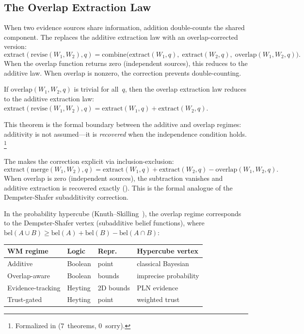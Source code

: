 \documentclass[11pt,openany]{report}
\begin{document}
\subsection{The Overlap Extraction Law}

When two evidence sources share information, addition
double-counts the shared component.  The
 replaces the additive extraction law
with an overlap-corrected version:
\[
  \mathrm{extract}(\mathrm{revise}(W_1, W_2), q)
  = \mathrm{combine}\bigl(
      \mathrm{extract}(W_1, q),\;
      \mathrm{extract}(W_2, q),\;
      \mathrm{overlap}(W_1, W_2, q)
    \bigr).
\]
When the overlap function returns zero (independent sources),
this reduces to the additive law.  When overlap is nonzero, the
correction prevents double-counting.

\begin{theorem}
\label{thm:additive-of-independent}
If $\mathrm{overlap}(W_1, W_2, q)$ is trivial for all~$q$, then
the overlap extraction law reduces to the additive extraction
law: $\mathrm{extract}(\mathrm{revise}(W_1, W_2), q) =
\mathrm{extract}(W_1, q) + \mathrm{extract}(W_2, q)$.
\end{theorem}

\noindent
This theorem is the formal boundary between the additive and
overlap regimes: additivity is not assumed---it is
\emph{recovered} when the independence condition holds.%
\footnote{Formalized in
(7~theorems, 0~sorry).}

The  makes the correction explicit
via inclusion-exclusion:
\[
  \mathrm{extract}(\mathrm{merge}(W_1, W_2), q)
  = \mathrm{extract}(W_1, q) + \mathrm{extract}(W_2, q)
  - \mathrm{overlap}(W_1, W_2, q).
\]
When overlap is zero (independent sources), the subtraction
vanishes and additive extraction is recovered exactly
().  This is the
formal analogue of the Dempster-Shafer subadditivity correction.

In the probability hypercube
(Knuth--Skilling~\cite{KnuthSkilling2012}), the overlap regime
corresponds to the Dempster-Shafer vertex (subadditive belief
functions), where $\mathrm{bel}(A \cup B) \ge
\mathrm{bel}(A) + \mathrm{bel}(B) - \mathrm{bel}(A \cap B)$:

\medskip
\begin{center}
\begin{tabular}{llll}
\toprule
\textbf{WM regime} & \textbf{Logic} & \textbf{Repr.} &
  \textbf{Hypercube vertex} \\
\midrule
Additive & Boolean & point &
  classical Bayesian \\
Overlap-aware & Boolean & bounds &
  imprecise probability \\
Evidence-tracking & Heyting & 2D bounds &
  PLN evidence \\
Trust-gated & Heyting & point &
  weighted trust \\
\bottomrule
\end{tabular}
\end{center}
\medskip
\end{document}
